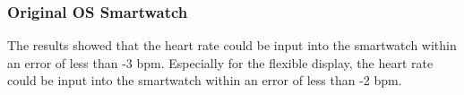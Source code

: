 \documentclass[sigchi,authordraft]{acmart}
\newcommand\tabref[1]{\textbf{Table~\ref{tab:#1}}}
\begin{document}
\subsubsection{Original OS Smartwatch}
The results showed that the heart rate could be input into the smartwatch within an error of less than -3 bpm. Especially for the flexible display, the heart rate could be input into the smartwatch within an error of less than -2 bpm.



\end{document}
